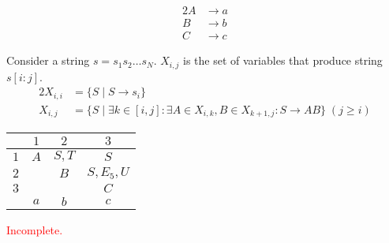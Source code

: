 \documentclass[docid=PA09]{tcom_PA}
\begin{document}
{\begin{alignat*}{2}
	A   &\rightarrow a\\
	B   &\rightarrow b\\
	C   &\rightarrow c
\end{alignat*}
\begin{center}
\end{center}
Consider a string $s=s_1s_2\ldots s_N$. $X_{i,j}$ is the set of variables that produce string $s[i:j]$.
\begin{alignat*}{2}
	X_{i,i} &= \{S\mid S \rightarrow s_i\}\\
	X_{i,j} &= \{S\mid \exists k \in [i,j] \colon \exists A\in X_{i,k},B\in X_{k+1,j}\colon S \rightarrow AB\}\;(j \geq i)
\end{alignat*}
\begin{center} \begin{tabular}{c || c | c | c}
	\backslashbox{$i$}{$j$} & $1             $ & $2             $ & $3      $ \\ \hline
	$1                    $ & $A             $ & $S, T          $ & $S      $ \\
    $2                    $ & \cellcolor{gray} & $B             $ & $S,E_5,U$ \\
	$3                    $ & \cellcolor{gray} & \cellcolor{gray} & $C      $ \\ \hline
	$                     $ & $a             $ & $b$     & $c$
\end{tabular} \end{center}
\textcolor{red}{Incomplete.}
}
\end{document}
